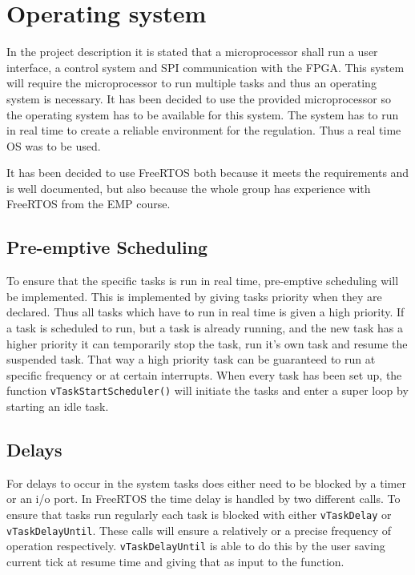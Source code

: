 \chapter{Operating system}\label{chap:os}



In the project description it is stated that a microprocessor shall run a user interface, a control system and SPI communication with the FPGA. This system will require the microprocessor to run multiple tasks and thus an operating system is necessary. It has been decided to use the provided microprocessor so the operating system has to be available for this system. The system has to run in real time to create a reliable environment for the regulation. Thus a real time OS was to be used.

It has been decided to use FreeRTOS both because it meets the requirements and is well documented, but also because the whole group has experience with FreeRTOS from the EMP course.

\section{ Pre-emptive Scheduling }

To ensure that the specific tasks is run in real time, pre-emptive  scheduling will be implemented. This is implemented by giving tasks priority when they are declared. Thus all tasks which have to run in real time is given a high priority. If a task is scheduled to run, but a task is already running, and the new task has a higher priority it can temporarily stop the task, run it's own task and resume the suspended task. That way a high priority task can be guaranteed to run at specific frequency or at certain interrupts. When every task has been set up, the function \texttt{vTaskStartScheduler()} will initiate the tasks and enter a super loop by starting an idle task.


\section{ Delays  }

For delays to occur in the system tasks does either need to be blocked by a timer or an i/o port. In FreeRTOS the time delay is handled by two different calls. To ensure that tasks run regularly each task is blocked with either \texttt{vTaskDelay} or \texttt{vTaskDelayUntil}. These calls will ensure a relatively or a precise frequency of operation respectively.  \texttt{vTaskDelayUntil} is able to do this by the user saving current tick at resume time and giving that as input to the function.
 
